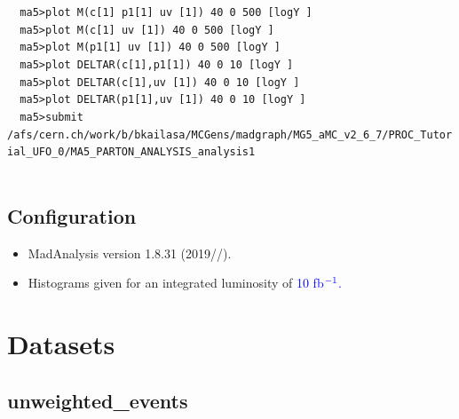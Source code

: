 \documentclass[a4paper, 10pt]{article}
\begin{document}
\texttt{ }\texttt{ }\texttt{ma5>plot M(c[1] p1[1] uv~[1]) 40 0  500 [logY ]\\
}
\texttt{ }\texttt{ }\texttt{ma5>plot M(c[1] uv~[1]) 40 0  500 [logY ]\\
}
\texttt{ }\texttt{ }\texttt{ma5>plot M(p1[1] uv~[1]) 40 0  500 [logY ]\\
}
\texttt{ }\texttt{ }\texttt{ma5>plot DELTAR(c[1],p1[1]) 40 0 10 [logY ]\\
}
\texttt{ }\texttt{ }\texttt{ma5>plot DELTAR(c[1],uv~[1]) 40 0 10 [logY ]\\
}
\texttt{ }\texttt{ }\texttt{ma5>plot DELTAR(p1[1],uv~[1]) 40 0 10 [logY ]\\
}
\texttt{ }\texttt{ }\texttt{ma5>submit /\-afs/\-cern.ch/\-work/\-b/\-bkailasa/\-MCGens/\-madgraph/\-MG5\_aMC\_v2\_6\_7/\-PROC\_Tutorial\_UFO\_0/\-MA5\_PARTON\_ANALYSIS\_analysis1\\
}
\texttt{ }\texttt{ }\subsection{ Configuration}

\begin{itemize}
  \item MadAnalysis version 1.8.31 (2019//).
   \item Histograms given for an integrated luminosity of \textcolor{blue}{10}\textcolor{blue}{ fb}$^{\textcolor{blue}{-1}}$\textcolor{blue}{.}
\textcolor{blue}{}
\end{itemize}
\newpage
\section{ Datasets}

\subsection{ unweighted\_events}
\end{document}
